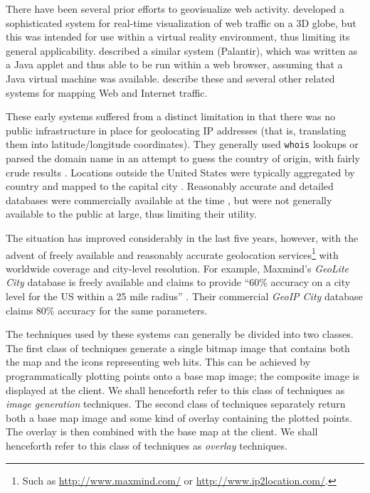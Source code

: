 \documentclass[acmtocl,acmnow]{acmtrans2m}
\begin{document}
There have been several prior efforts to geovisualize web activity.
 developed a sophisticated system for
real-time visualization of web traffic on a 3D globe, but this was
intended for use within a virtual reality environment, thus limiting its
general applicability.  described a similar
system (Palantir), which was written as a Java applet and thus able to
be run within a web browser, assuming that a Java virtual machine was
available.  describe these
and several other related systems for mapping Web and Internet traffic.

These early systems suffered from a distinct limitation in that there
was no public infrastructure in place for geolocating IP addresses (that
is, translating them into latitude/longitude coordinates). They
generally used \texttt{whois} lookups or parsed the domain name in an
attempt to guess the country of origin, with fairly crude results
\cite{Lamm-SE-1996-webvis}. Locations outside the United States were
typically aggregated by country and mapped to the capital city
\cite{Lamm-SE-1996-webvis,Papa-N-1998-Palantir,Jian-B-2000-cybermap}.
Reasonably accurate and detailed databases were commercially available
at the time \cite[p.\ 1466]{Lamm-SE-1996-webvis}, but were not generally
available to the public at large, thus limiting their utility.

The situation has improved considerably in the last five years, however,
with the advent of freely available and reasonably accurate geolocation
services\footnote{Such as \url{http://www.maxmind.com/} or
\url{http://www.ip2location.com/}.} with worldwide coverage and
city-level resolution. For example, Maxmind's \emph{GeoLite City}
database is freely available and claims to provide ``60\% accuracy on a
city level for the US within a 25 mile radius''
\cite{Maxm-G-2006-GeoLiteCity}. Their commercial \emph{GeoIP City}
database claims 80\% accuracy for the same parameters.

The techniques used by these systems can generally be divided into two
classes. The first class of techniques generate a single bitmap image
that contains both the map and the icons representing web hits. This can
be achieved by programmatically plotting points onto a base map image;
the composite image is displayed at the client. We shall henceforth
refer to this class of techniques as \emph{image generation} techniques.
The second class of techniques separately return both a base map image
and some kind of overlay containing the plotted points. The overlay is
then combined with the base map at the client. We shall henceforth refer
to this class of techniques as \emph{overlay} techniques.
\end{document}
